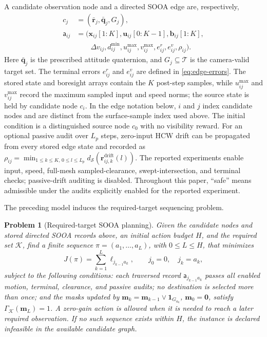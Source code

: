 \documentclass{IEEEtaes}
\newtheorem{problem}{Problem}
\begin{document}
A candidate observation node and a directed SOOA edge are, respectively,
\begin{equation}
  \begin{aligned}
  c_j&=(\bar{\mathbf r}_j,\bar{\mathbf q}_j,G_j),\\
  \mathsf a_{ij}&=\bigl(\mathbf x_{ij}[1{:}K],\mathbf u_{ij}[0{:}K-1],\mathbf b_{ij}[1{:}K],\\
  &\qquad \Delta v_{ij},d_{ij}^{\min},u_{ij}^{\max},v_{ij}^{\max},e_{ij}^{r},e_{ij}^{v},\rho_{ij}\bigr).
  \end{aligned}
  \label{eq:sooa}
\end{equation}
Here $\bar{\mathbf q}_j$ is the prescribed attitude quaternion, and $G_j\subseteq\mathcal T$ is the camera-valid target set. The terminal errors $e_{ij}^{r}$ and $e_{ij}^{v}$ are defined in \eqref{eq:edge-errors}. The stored state and boresight arrays contain the $K$ post-step samples, while $u_{ij}^{\max}$ and $v_{ij}^{\max}$ record the maximum sampled input and speed norms; the source state is held by candidate node $c_i$. In the edge notation below, $i$ and $j$ index candidate nodes and are distinct from the surface-sample index used above. The initial condition is a distinguished source node $c_0$ with no visibility reward. For an optional passive audit over $L_p$ steps, zero-input HCW drift can be propagated from every stored edge state and recorded as $\rho_{ij}=\min_{1\le k\le K,\,0\le l\le L_p}d_{\mathcal S}(\mathbf r_{ij,k}^{\mathrm{drift}}(l))$. The reported experiments enable input, speed, full-mesh sampled-clearance, swept-intersection, and terminal checks; passive-drift auditing is disabled. Throughout this paper, ``safe'' means admissible under the audits explicitly enabled for the reported experiment.

The preceding model induces the required-target sequencing problem.

\begin{problem}[Required-target SOOA planning]
\label{prob:required-target-sooa}
Given the candidate nodes and stored directed SOOA records above, an initial
action budget $H$, and the required set $\mathcal K$, find a finite sequence
$\pi=(a_1,\ldots,a_L)$, with $0\le L\le H$, that minimizes
\begin{equation}
  J(\pi)=\sum_{k=1}^{L}\ell_{j_{k-1}a_k},
  \qquad j_0=0,\quad j_k=a_k,
  \label{eq:problem-objective}
\end{equation}
subject to the following conditions: each traversed record
$\mathsf a_{j_{k-1}a_k}$ passes all enabled motion, terminal, clearance, and
passive audits; no destination is selected more than once; and the masks
updated by $\mathbf m_k=\mathbf m_{k-1}\lor\mathbf 1_{G_{a_k}}$, $\mathbf m_0=\mathbf0$, satisfy
$\Gamma_{\mathcal K}(\mathbf m_L)=1$. A zero-gain action is allowed when it is needed
to reach a later required observation. If no such sequence exists within $H$,
the instance is declared infeasible in the available candidate graph.
\end{problem}
\end{document}

